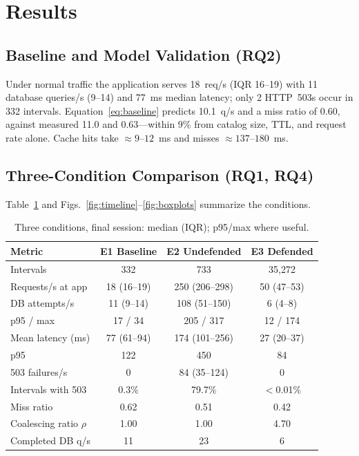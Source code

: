 \documentclass[journal]{IEEEtran}
\begin{document}
\section{Results}
\label{sec:results}

\subsection{Baseline and Model Validation (RQ2)}
Under normal traffic the application serves 18~req/s (IQR 16--19) with 11 database
queries/s (9--14) and 77~ms median latency; only 2 HTTP~503s occur in 332 intervals.
Equation~\eqref{eq:baseline} predicts 10.1~q/s and a miss ratio of 0.60, against
measured 11.0 and 0.63---within 9\% from catalog size, TTL, and request rate alone.
Cache hits take ${\approx}9$--$12$~ms and misses ${\approx}137$--$180$~ms.

\subsection{Three-Condition Comparison (RQ1, RQ4)}
Table~\ref{tab:three} and Figs.~\ref{fig:timeline}--\ref{fig:boxplots} summarize the
conditions.

\begin{table}[t]
\centering
\caption{Three conditions, final session: median (IQR); p95/max where useful.}
\label{tab:three}
\footnotesize
\setlength{\tabcolsep}{3pt}
\begin{tabular}{@{}lccc@{}}
\toprule
Metric & E1 Baseline & E2 Undefended & E3 Defended \\
\midrule
Intervals & 332 & 733 & 35{,}272 \\
Requests/s at app & 18 (16--19) & 250 (206--298) & 50 (47--53) \\
DB attempts/s & 11 (9--14) & 108 (51--150) & 6 (4--8) \\
\quad p95 / max & 17 / 34 & 205 / 317 & 12 / 174 \\
Mean latency (ms) & 77 (61--94) & 174 (101--256) & 27 (20--37) \\
\quad p95 & 122 & 450 & 84 \\
503 failures/s & 0 & 84 (35--124) & 0 \\
Intervals with 503 & 0.3\% & 79.7\% & $<$0.01\% \\
Miss ratio & 0.62 & 0.51 & 0.42 \\
Coalescing ratio $\rho$ & 1.00 & 1.00 & 4.70 \\
Completed DB q/s & 11 & 23 & 6 \\
\bottomrule
\end{tabular}
\end{table}
\end{document}
